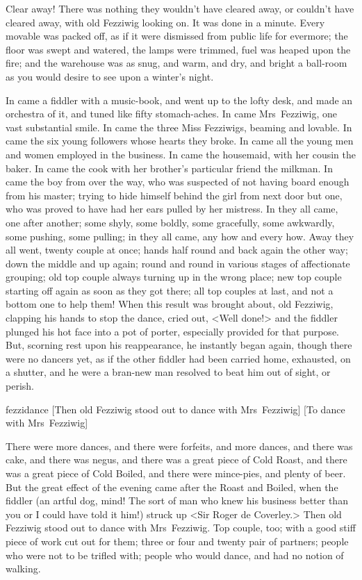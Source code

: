 Clear away! There was nothing they wouldn't have cleared away, or couldn't have cleared away, with old Fezziwig looking on. It was done in a minute. Every movable was packed off, as if it were dismissed from public life for evermore; the floor was swept and watered, the lamps were trimmed, fuel was heaped upon the fire; and the warehouse was as snug, and warm, and dry, and bright a ball-room as you would desire to see upon a winter's night.

In came a fiddler with a music-book, and went up to the lofty desk, and made an orchestra of it, and tuned like fifty stomach-aches. In came Mrs~Fezziwig, one vast substantial smile. In came the three Miss Fezziwigs, beaming and lovable. In came the six young followers whose hearts they broke. In came all the young men and women employed in the business. In came the housemaid, with her cousin the baker. In came the cook with her broth\-er's particular friend the milkman. In came the boy from over the way, who was suspected of not having board enough from his master; trying to hide himself behind the girl from next door but one, who was proved to have had her ears pulled by her mistress. In they all came, one after another; some shyly, some boldly, some gracefully, some awkwardly, some pushing, some pulling; in they all came, any how and every how. Away they all went, twenty couple at once; hands half round and back again the other way; down the middle and up again; round and round in various stages of affectionate grouping; old top couple always turning up in the wrong place; new top couple starting off again as soon as they got there; all top couples at last, and not a bottom one to help them! When this result was brought about, old Fezziwig, clapping his hands to stop the dance, cried out, <Well done!> and the fiddler plunged his hot face into a pot of porter, especially provided for that purpose. But, scorning rest upon his reappearance, he instantly began again, though there were no dancers yet, as if the other fiddler had been carried home, exhausted, on a shutter, and he were a bran-new man resolved to beat him out of sight, or perish.

\begin{colorbigpic}
	[\basicscale]
	{fezzidance}
	[Then old Fezziwig stood out to dance with Mrs~Fezziwig]
	[To dance with Mrs~Fezziwig]
\end{colorbigpic}


There were more dances, and there were forfeits, and more dan\-ces, and there was cake, and there was negus, and there was a great piece of Cold Roast, and there was a great piece of Cold Boiled, and there were mince-pies, and plenty of beer. But the great effect of the evening came after the Roast and Boiled, when the fiddler (an artful dog, mind! The sort of man who knew his business better than you or I could have told it him!) struck up <Sir Roger de Coverley.> Then old Fezziwig stood out to dance with Mrs~Fezziwig. Top couple, too; with a good stiff piece of work cut out for them; three or four and twenty pair of partners; people who were not to be trifled with; people who would dance, and had no notion of walking.

